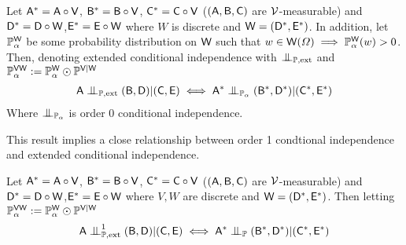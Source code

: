 \begin{theorem}\label{th:dawid_constantionou}
Let $\mathsf{A}^*=\mathsf{A}\circ \mathsf{V}$, $\mathsf{B}^*=\mathsf{B}\circ\mathsf{V}$, $\mathsf{C}^*=\mathsf{C}\circ \mathsf{V}$ ($(\mathsf{A},\mathsf{B},\mathsf{C})$ are $\mathcal{V}$-measurable) and $\mathsf{D}^*=\mathsf{D}\circ \mathsf{W}$,$\mathsf{E}^*=\mathsf{E}\circ \mathsf{W}$ where $W$ is discrete and $\mathsf{W}=(\mathsf{D}^*,\mathsf{E}^*)$. In addition, let $\mathbb{P}_\alpha^{\mathsf{W}}$ be some probability distribution on $\mathsf{W}$ such that $w\in\mathsf{W}(\Omega)\implies \mathbb{P}_\alpha^{\mathsf{W}}(w)>0$. Then, denoting extended conditional independence with $\CI_{\prob{P},\text{ext}}$ and $\mathbb{P}_\alpha^{\mathsf{VW}}:=\mathbb{P}_\alpha^{\mathsf{W}}\odot \mathbb{P}^{\mathsf{V}|\mathsf{W}}$
\begin{align}
	\RV{A}\CI_{\prob{P},\text{ext}}(\RV{B},\RV{D})|(\RV{C},\RV{E})\iff \RV{A}^*\CI_{\prob{P}_\alpha}(\RV{B}^*,\RV{D}^*)|(\RV{C}^*,\RV{E}^*)
\end{align}
Where $\CI_{\prob{P}_\alpha}$ is order 0 conditional independence.
\end{theorem}

This result implies a close relationship between order 1 condtional independence and extended conditional independence.

\begin{theorem}
Let $\mathsf{A}^*=\mathsf{A}\circ \mathsf{V}$, $\mathsf{B}^*=\mathsf{B}\circ\mathsf{V}$, $\mathsf{C}^*=\mathsf{C}\circ \mathsf{V}$ ($(\mathsf{A},\mathsf{B},\mathsf{C})$ are $\mathcal{V}$-measurable) and $\mathsf{D}^*=\mathsf{D}\circ \mathsf{W}$,$\mathsf{E}^*=\mathsf{E}\circ \mathsf{W}$ where $V,W$ are discrete and $\mathsf{W}=(\mathsf{D}^*,\mathsf{E}^*)$. Then letting $\mathbb{P}_\alpha^{\mathsf{VW}}:=\mathbb{P}_\alpha^{\mathsf{W}}\odot \mathbb{P}^{\mathsf{V}|\mathsf{W}}$
\begin{align}
	\RV{A}\CI^1_{\prob{P},\text{ext}}(\RV{B},\RV{D})|(\RV{C},\RV{E})\iff \RV{A}^*\CI_{\prob{P}}(\RV{B}^*,\RV{D}^*)|(\RV{C}^*,\RV{E}^*)
\end{align}
\end{theorem}

